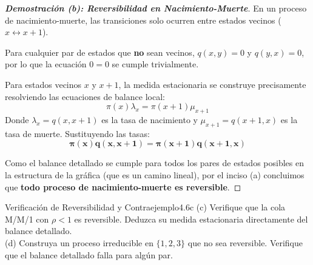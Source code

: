\documentclass[10pt,a4paper]{article}
\begin{document}
\newpage

\begin{proof}[\textbf{Demostración (b): Reversibilidad en Nacimiento-Muerte}]
    En un proceso de nacimiento-muerte, las transiciones solo ocurren entre estados vecinos ($x \leftrightarrow x+1$). 
    
    Para cualquier par de estados que \textbf{no} sean vecinos, $q(x, y) = 0$ y $q(y, x) = 0$, por lo que la ecuación $0 = 0$ se cumple trivialmente.
    
    Para estados vecinos $x$ y $x+1$, la medida estacionaria se construye precisamente resolviendo las ecuaciones de balance local:
    \[ \pi(x) \lambda_x = \pi(x+1) \mu_{x+1} \]
    Donde $\lambda_x = q(x, x+1)$ es la tasa de nacimiento y $\mu_{x+1} = q(x+1, x)$ es la tasa de muerte.
    Sustituyendo las tasas:
    \[ \mathbf{\pi(x) q(x, x+1) = \pi(x+1) q(x+1, x)} \]
    
    Como el balance detallado se cumple para todos los pares de estados posibles en la estructura de la gráfica (que es un camino lineal), por el inciso (a) concluimos que \textbf{todo proceso de nacimiento-muerte es reversible}.
\end{proof}

\newpage


\begin{ejercicio}{Verificación de Reversibilidad y Contraejemplo}{4.6c}
    (c) Verifique que la cola M/M/1 con $\rho < 1$ es reversible. Deduzca su medida estacionaria directamente del balance detallado. \\
    (d) Construya un proceso irreducible en $\{1, 2, 3\}$ que no sea reversible. Verifique que el balance detallado falla para algún par.
\end{ejercicio}

\vspace{2mm}
\end{document}
